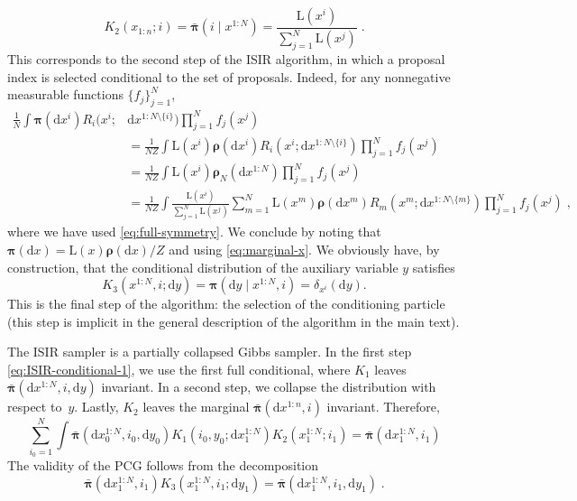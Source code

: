 \documentclass{article}
\def\rmd{\operatorname{d}\hspace{-2pt}}
\newcommand{\chunk}[3]{#1_{#2:#3}}
\def\rmd{\mathrm{d}}
\def\eqsp{\,}
\def\wrt{w.r.t.}
\def\eqsp{\;}
\newcommand{\1}{\mathds{1}}
\newcommand{\chunku}[3]{#1^{#2:#3}}
\newcommand{\chunkum}[4]{#1^{#2:#3 \setminus \{#4\}}}
\def\const{Z}
\def\measpi{\boldsymbol{\pi}}
\def\measprop{\boldsymbol{\rho}}
\def\rmd{\mathrm{d}}
\def\likelihood{\mathrm{L}}
\def\bmeaspi{\bar{\measpi}}
\def\wrt{with respect to}
\begin{document}
\begin{equation}
\label{eq:ISIR-conditional-2}
K_2(\chunk{x}{1}{n}; i)= \bmeaspi(i \mid \chunku{x}{1}{N}) = \frac{\likelihood(x^i)}{\sum_{j=1}^N \likelihood(x^j)} \eqsp.
\end{equation}
This corresponds to the second step of the ISIR algorithm, in which a proposal index is selected conditional to the set of proposals.
Indeed, for any nonnegative measurable functions $\{f_j\}_{j=1}^N$,
\begin{align*}
\frac{1}{N} \int \measpi(\rmd x^i)R_i(x^i;& \rmd \chunkum{x}{1}{N}{i}) \prod_{j=1}^N f_j(x^j)\\
& = \frac{1}{N \const} \int \likelihood(x^i) \measprop(\rmd x^i)  R_i(x^i;  \rmd \chunkum{x}{1}{N}{i}) \prod_{j=1}^N f_j(x^j) \\
& = \frac{1}{N \const} \int \likelihood(x^i) \measprop_N(\rmd\chunku{x}{1}{N}) \prod_{j=1}^N f_j(x^j) \\
& = \frac{1}{N \const} \int \frac{\likelihood(x^i)}{\sum_{j=1}^N \likelihood(x^j)}
\sum_{m=1}^N \likelihood(x^m) \measprop(\rmd x^m) R_m(x^m;  \rmd \chunkum{x}{1}{N}{m}) \prod_{j=1}^N f_j(x^j)\eqsp,
\end{align*}
where we have used \eqref{eq:full-symmetry}. We conclude by noting that $\measpi(\rmd x)= \likelihood(x) \measprop(\rmd x) / \const$ and using \eqref{eq:marginal-x}.
We obviously have, by construction, that the conditional distribution of the auxiliary variable $y$  satisfies
\begin{equation}
\label{eq:ISIR-conditional-3}
K_3(\chunku{x}{1}{N}, i; \rmd y)= \measpi(\rmd y \mid \chunku{x}{1}{N}, i)= \delta_{x^i}(\rmd y).
\end{equation}
This is the final step of the algorithm: the selection of the conditioning particle (this step is implicit in the general description of the algorithm in the main text).

The ISIR sampler is a partially collapsed Gibbs sampler. In the first step \eqref{eq:ISIR-conditional-1}, we use the first full conditional, where $K_1$ leaves $\bmeaspi(\rmd \chunku{x}{1}{N}, i, \rmd y)$ invariant. In a second step, we collapse the distribution \wrt\ $y$. Lastly, $K_2$ leaves the marginal $\bmeaspi(\rmd \chunku{x}{1}{n}, i)$ invariant. Therefore,
\[
\sum_{i_0=1}^N \int \bmeaspi(\rmd \chunku{x_0}{1}{N},i_0,\rmd y_0)
K_1(i_0,y_0; \rmd \chunku{x_1}{1}{N}) K_2(\chunku{x_1}{1}{N};i_1)= \bmeaspi(\rmd \chunku{x_1}{1}{N},i_1)
\]
The validity of the PCG follows from the decomposition
\[
\bmeaspi(\rmd \chunku{x_1}{1}{N},i_1) K_3(\chunku{x_1}{1}{N},i_1 ; \rmd y_1)= \bmeaspi(\rmd \chunku{x_1}{1}{N},i_1, \rmd y_1) \eqsp.
\]
\end{document}
